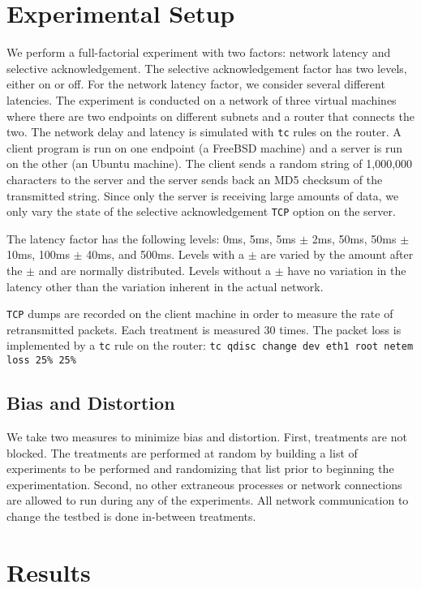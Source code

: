 \documentclass[]{article}
\begin{document}
\section{Experimental Setup}\label{setup}
We perform a full-factorial experiment with two factors: network latency and
selective acknowledgement. The selective acknowledgement factor has two levels,
either on or off. For the network latency factor, we consider several different
latencies. The experiment is conducted on a network of three virtual machines 
where there are two endpoints on different subnets and a router that connects 
the two. The network delay and latency is simulated with \texttt{tc} rules on 
the router. A client program is run on one endpoint (a FreeBSD machine) and a 
server is run on the other (an Ubuntu machine). The client sends a random string 
of 1,000,000 characters to the server and the server sends back an MD5 checksum 
of the transmitted string. Since only the server is receiving large amounts of 
data, we only vary the state of the selective acknowledgement \texttt{TCP} option 
on the server. 

The latency factor has the following levels: 0ms, 5ms, 5ms $\pm$ 2ms, 50ms, 50ms 
$\pm$ 10ms, 100ms $\pm$ 40ms, and 500ms. Levels with a $\pm$ are varied by the 
amount after the $\pm$ and are normally distributed. Levels without a $\pm$ have 
no variation in the latency other than the variation inherent in the actual network.

\texttt{TCP} dumps are recorded on the client machine in order to
measure the rate of retransmitted packets. Each treatment is measured 30 times. 
The packet loss is implemented by a \texttt{tc} rule on the router: 
\texttt{tc qdisc change dev eth1 root netem loss 25\% 25\%}


\subsection{Bias and Distortion}
We take two measures to minimize bias and distortion.
First, treatments are not blocked. The treatments are performed at random by
building a list of experiments to be performed and randomizing that list prior
to beginning the experimentation. Second, no other extraneous processes or 
network connections are allowed to run during any of the experiments. All
network communication to change the testbed is done in-between treatments.

\section{Results}\label{results}
\end{document}
